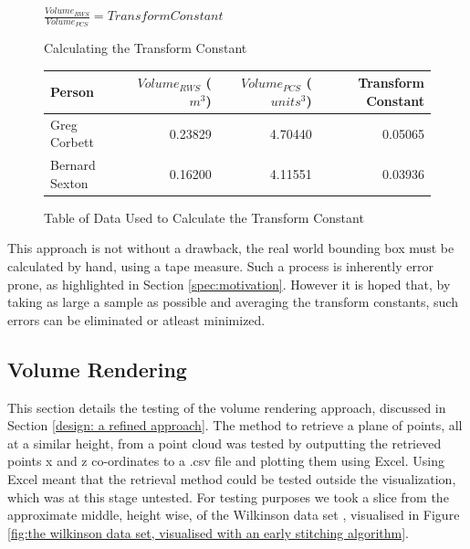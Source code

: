 \begin{figure}[h]
\begin{center}
$\frac{Volume_{RWS}}{Volume_{PCS}} = Transform Constant$
\end{center}
\caption{Calculating the Transform Constant}
\label{testing: calculating the transform constant}
\end{figure}
\begin{figure}[h]
\begin{center}
  \begin{tabular}{| l | r | r | r |}
    \hline
    Person & $Volume_{RWS}$ ($m^3$) & $Volume_{PCS}$ ($units^3$) & Transform Constant \\ \hline
    Greg Corbett 	& 0.23829 & 4.70440 & 0.05065\\ \hline
    Bernard Sexton 	& 0.16200 & 4.11551 & 0.03936\\ \hline
  \end{tabular}
\end{center}
\caption{Table of Data Used to Calculate the Transform Constant}
\label{testing: table of data used to calculate the transform constant}
\end{figure}

This approach is not without a drawback, the real world bounding box must be calculated by hand, using a tape measure. 
Such a process is inherently error prone, as highlighted in Section \ref{spec:motivation}. 
However it is hoped that, by taking as large a sample as possible and averaging the transform constants, such errors can be eliminated or atleast minimized.\\

\subsection{Volume Rendering}
\label{testing: volume rendering}
This section details the testing of the volume rendering approach, discussed in Section \ref{design: a refined approach}. 
The method to retrieve a plane of points, all at a similar height, from a point cloud was tested by outputting the retrieved points x and z co-ordinates to a .csv file and plotting them using Excel. 
Using Excel meant that the retrieval method could be tested outside the visualization, which was at this stage untested. 
For testing purposes we took a slice from the approximate middle, height wise, of the Wilkinson data set , visualised in Figure \ref{fig:the wilkinson data set, visualised with an early stitching algorithm}.\\

